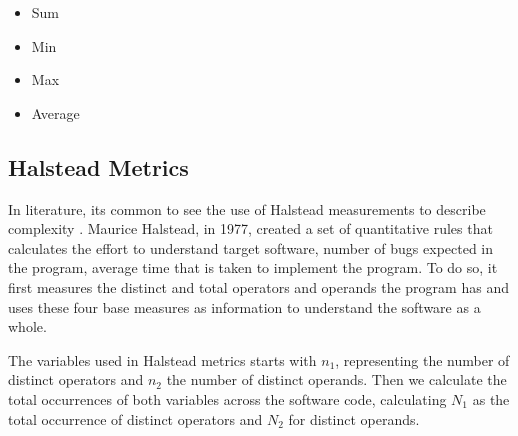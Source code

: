 \begin{itemize}
  \item Sum 
  \item Min 
  \item Max 
  \item Average 
\end{itemize}

\subsection{Halstead Metrics}

In literature, its common to see the use of Halstead measurements to describe complexity \cite{article:complexity_with_halstead}.
Maurice Halstead, in 1977, created a set of quantitative rules that calculates the effort to understand target software, number of bugs
expected in the program, average time that is taken to implement the program. To do so, it first measures the distinct and total
operators and operands the program has and uses these four base measures as information to understand the software as a whole.

The variables used in Halstead metrics starts with $n_{1}$, representing the number of distinct operators and $n_{2}$ the
number of distinct operands. Then we calculate the total occurrences of both variables across the software code, calculating
$N_{1}$ as the total occurrence of distinct operators and $N_{2}$ for distinct operands.


